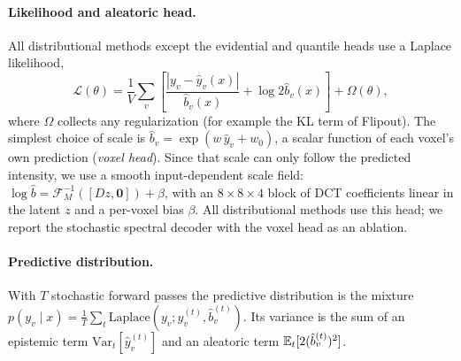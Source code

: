 \paragraph{Likelihood and aleatoric head.} All distributional methods except the evidential and quantile heads use a Laplace likelihood,
\begin{equation}\label{eq:nll}
	\mathcal{L}(\theta) = \frac{1}{V}\sum_v\left[\frac{|y_v - \hat y_v(x)|}{\hat b_v(x)} + \log 2\hat b_v(x)\right] + \Omega(\theta),
\end{equation}
where $\Omega$ collects any regularization (for example the KL term of Flipout). The simplest choice of scale is $\hat b_v = \exp(w\,\hat y_v + w_0)$, a scalar function of each voxel's own prediction (\emph{voxel head}). Since that scale can only follow the predicted intensity, we use a smooth input-dependent scale field: $\log\hat b = \mathcal{F}^{-1}_M([D z, \mathbf{0}]) + \beta$, with an $8\times8\times4$ block of DCT coefficients linear in the latent $z$ and a per-voxel bias $\beta$. All distributional methods use this head; we report the stochastic spectral decoder with the voxel head as an ablation.

\paragraph{Predictive distribution.} With $T$ stochastic forward passes the predictive distribution is the mixture $p(y_v\mid x) = \frac1T\sum_{t}\mathrm{Laplace}(y_v;\hat y^{(t)}_v, \hat b^{(t)}_v)$. Its variance is the sum of an epistemic term $\mathrm{Var}_t[\hat y^{(t)}_v]$ and an aleatoric term $\mathbb{E}_t[2(\hat b^{(t)}_v)^2]$.

